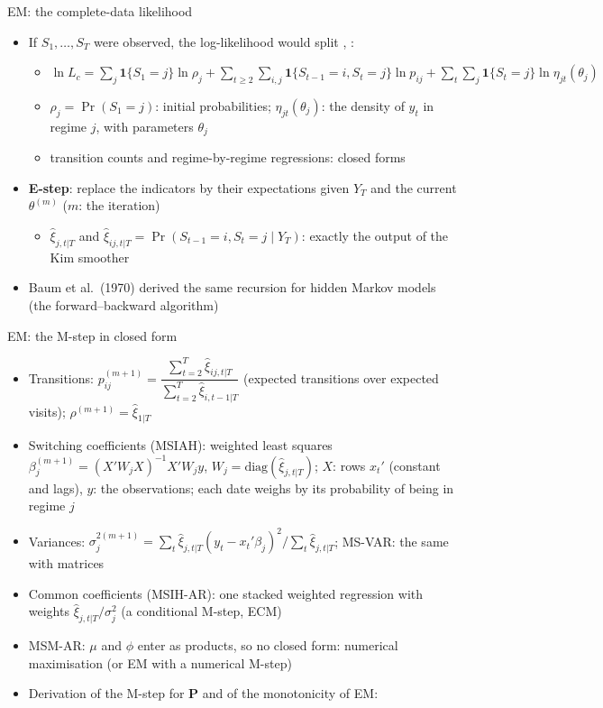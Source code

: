 \begin{frame}{EM: the complete-data likelihood}
\itemsize{\small}
\begin{itemize}
    \item If $S_1, \dots, S_T$ were observed, the log-likelihood would split , :
    \begin{itemize}
        \item $\ln L_c = \sum_j \mathbf{1}\{S_1 = j\}\ln\rho_j + \sum_{t\ge2}\sum_{i,j}\mathbf{1}\{S_{t-1} = i, S_t = j\}\ln p_{ij} + \sum_t\sum_j \mathbf{1}\{S_t = j\}\ln\eta_{jt}(\theta_j)$
        \item $\rho_j = \Pr(S_1 = j)$: initial probabilities; $\eta_{jt}(\theta_j)$: the density of $y_t$ in regime $j$, with parameters $\theta_j$
        \item transition counts and regime-by-regime regressions: closed forms
    \end{itemize}
    \item \textbf{E-step}: replace the indicators by their expectations given $Y_T$ and the current $\theta^{(m)}$ ($m$: the iteration)
    \begin{itemize}
        \item $\hat\xi_{j,t|T}$ and $\hat\xi_{ij,t|T} = \Pr(S_{t-1} = i, S_t = j \mid Y_T)$: exactly the output of the Kim smoother
    \end{itemize}
    \item Baum et al.\ (1970) derived the same recursion for hidden Markov models (the forward--backward algorithm)
\end{itemize}
\end{frame}

\begin{frame}{EM: the M-step in closed form}
\itemsize{\small}
\begin{itemize}
    \item Transitions: $p_{ij}^{(m+1)} = \dfrac{\sum_{t=2}^T \hat\xi_{ij,t|T}}{\sum_{t=2}^T \hat\xi_{i,t-1|T}}$ (expected transitions over expected visits); $\rho^{(m+1)} = \hat\xi_{1|T}$
    \item Switching coefficients (MSIAH): weighted least squares $\beta_j^{(m+1)} = (X'W_jX)^{-1}X'W_jy$, $W_j = \mathrm{diag}(\hat\xi_{j,t|T})$; $X$: rows $x_t'$ (constant and lags), $y$: the observations; each date weighs by its probability of being in regime $j$
    \item Variances: $\sigma_j^{2(m+1)} = \sum_t\hat\xi_{j,t|T}(y_t - x_t'\beta_j)^2/\sum_t\hat\xi_{j,t|T}$; MS-VAR: the same with matrices
    \item Common coefficients (MSIH-AR): one stacked weighted regression with weights $\hat\xi_{j,t|T}/\sigma_j^2$ (a conditional M-step, ECM)
    \item MSM-AR: $\mu$ and $\phi$ enter as products, so no closed form: numerical maximisation (or EM with a numerical M-step)
    \item Derivation of the M-step for $\mathbf{P}$ and of the monotonicity of EM:   %
\end{itemize}
\end{frame}

